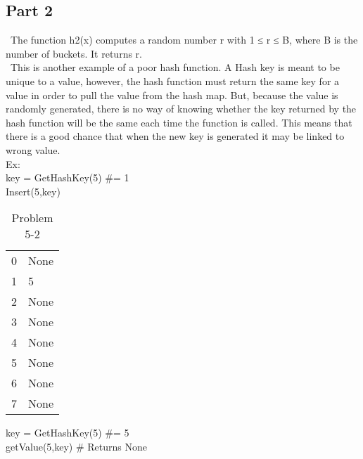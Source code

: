 \documentclass{article}
\begin{document}
		\subsection{Part 2}
		\ The function h2(x) computes a random number r with 1 ≤ r ≤ B, where B is the number of buckets. It returns r.\\
		\ This is another example of a poor hash function. A Hash key is meant to be unique to a value, however, the hash function must return the same key for a value in order to pull the value from the hash map. But, because the value is randomly generated, there is no way of knowing whether the key returned by the hash function will be the same each time the function is called. This means that there is a good chance that when the new key is generated it may be linked to wrong value.\\Ex:\\
		key = GetHashKey(5)  \#= 1\\
		Insert(5,key)
		\begin{table}[H]
			\centering
			\caption{Problem 5-2}
			\begin{tabular}{ll}
				0& None\\
				1& 5\\
				2& None\\
				3& None\\
				4& None\\
				5& None\\
				6& None\\
				7& None\\
			\end{tabular}
		\end{table}
		
		key = GetHashKey(5)  \#= 5\\
		getValue(5,key) \# Returns None\\
		
		
	
\end{document}
